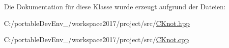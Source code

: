 Die Dokumentation für diese Klasse wurde erzeugt aufgrund der Dateien\+:\begin{DoxyCompactItemize}
\item 
C\+:/portable\+Dev\+Env\+\_/workspace2017/project/src/\hyperlink{_c_knot_8hpp}{C\+Knot.\+hpp}\item 
C\+:/portable\+Dev\+Env\+\_/workspace2017/project/src/\hyperlink{_c_knot_8cpp}{C\+Knot.\+cpp}\end{DoxyCompactItemize}
